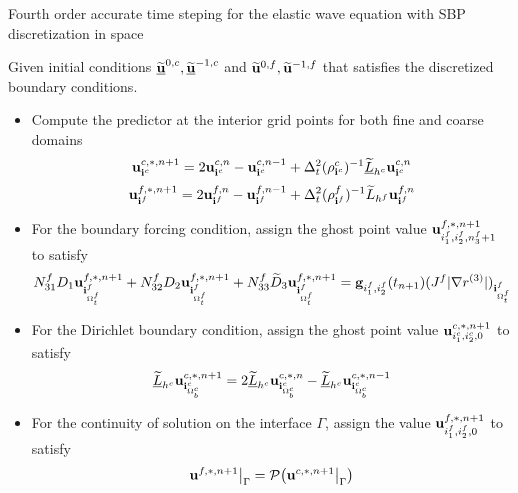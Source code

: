 \begin{breakablealgorithm}
	\caption{Fourth order accurate time steping for the elastic wave equation with SBP discretization in space}\label{first_alg}
	Given initial conditions $\uline{\wt{{\bf u}}}^{0,c}, \uline{\wt{{\bf u}}}^{-1,c}$ and $\widetilde{{\bf u}}^{0,f}, \widetilde{{\bf u}}^{-1,f}$ that satisfies the discretized boundary conditions.
	
	\begin{itemize}
		\item  {Compute the predictor at the interior grid points for both fine and coarse domains
			\begin{equation*}
			{\bf u}^{c,*,n+1}_{{\bf i}^c} = 2{\bf u}^{c,n}_{{\bf i}^c} - {\bf u}^{c,n-1}_{{\bf i}^c} + \Delta_t^2(\rho^c_{{\bf i}^c})^{-1}\uline{\wt{L}}_{h^c} {\bf{u}}^{c,n}_{{\bf i}^c}
			\end{equation*}
			\begin{equation*}
			{\bf u}^{f,*,n+1}_{{\bf i}^f} = 2{\bf u}^{f,n}_{{\bf i}^f} - {\bf u}^{f,n-1}_{{\bf i}^f} + \Delta_t^2(\rho^f_{{\bf i}^f})^{-1}{\widetilde{L}}_{h^f} {\bf{u}}^{f,n}_{{\bf i}^f}
			\end{equation*}
		}
		\item {For the boundary forcing condition, assign the ghost point value ${\bf u}^{f,*,n+1}_{i_1^f,i_2^f,n^f_3+1}$ to satisfy
			\begin{equation*}
			N_{31}^fD_1{\bf u}^{f,*,n+1}_{{\bf i}^f_{\Omega^f_t}} + N_{32}^fD_2{\bf u}^{f,*,n+1}_{{\bf i}^f_{\Omega^f_t}} + N_{33}^f\widetilde{D}_3{\bf u}^{f,*,n+1}_{{\bf i}^f_{\Omega^f_t}} = {\bf g}_{i_1^f,i_2^f}(t_{n+1})(J^f|\nabla r^{(3)}|)_{{\bf i}^f_{\Omega^f_t}}
			\end{equation*}
		}
		\item {For the Dirichlet boundary condition, assign the ghost point value ${\bf u}^{c,*,n+1}_{i_1^c,i_2^c,0}$ to satisfy
			\begin{equation*}
			\uline{\wt{L}}_{h^c} {\bf{u}}^{c,*,n+1}_{{\bf i}^c_{\Omega^c_b}} = 2\uline{\wt{L}}_{h^c}{\bf{u}}^{c,*,n}_{{\bf i}^c_{\Omega^c_b}} - 	\uline{\wt{L}}_{h^c} {\bf{u}}^{c,*,n-1}_{{\bf i}^c_{\Omega^c_b}}
			\end{equation*}
		}
		\item{For the continuity of solution on the interface $\Gamma$, assign the value ${\bf u}^{f,*,n+1}_{i_1^f,i_2^f,0}$ to satisfy
			\begin{equation*}
			{\bf u}^{f,*,n+1}\big|_{\Gamma} = \mathcal{P}\big({\bf u}^{c,*,n+1}\big|_{\Gamma}\big)
			\end{equation*}
}
\end{itemize}
\end{breakablealgorithm}
